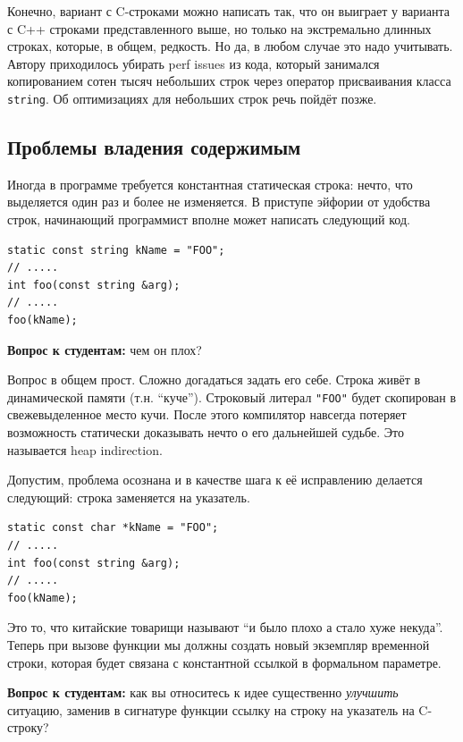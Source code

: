 \documentclass[a4paper,12pt,oneside]{book}
\newif\ifanswers
\begin{document}
Конечно, вариант с C-строками можно написать так, что он выиграет у варианта с C++ строками представленного выше, но только на экстремально длинных строках, которые, в общем, редкость. Но да, в любом случае это надо учитывать. Автору приходилось убирать perf issues из кода, который занимался копированием сотен тысяч небольших строк через оператор присваивания класса \lstinline!string!. Об оптимизациях для небольших строк речь пойдёт позже. 

\subsection{Проблемы владения содержимым}\label{subsub:stringview}

Иногда в программе требуется константная статическая строка: нечто, что выделяется один раз и более не изменяется. В приступе эйфории от удобства строк, начинающий программист вполне может написать следующий код.

\begin{lstlisting}
static const string kName = "FOO";
// .....
int foo(const string &arg);
// .....
foo(kName);
\end{lstlisting}

\textbf{Вопрос к студентам:} чем он плох?

\ifanswers
Ответ ниже.
\fi

Вопрос в общем прост. Сложно догадаться задать его себе. Строка живёт в динамической памяти (т.н. ``куче''). Строковый литерал \lstinline!"FOO"! будет скопирован в свежевыделенное место кучи. После этого компилятор навсегда потеряет возможность статически доказывать нечто о его дальнейшей судьбе. Это называется heap indirection.

Допустим, проблема осознана и в качестве шага к её исправлению делается следующий: строка заменяется на указатель.

\begin{lstlisting}
static const char *kName = "FOO";
// .....
int foo(const string &arg);
// .....
foo(kName);
\end{lstlisting}

Это то, что китайские товарищи называют ``и было плохо а стало хуже некуда''. Теперь при вызове функции мы должны создать новый экземпляр временной строки, которая будет связана с константной ссылкой в формальном параметре.

\textbf{Вопрос к студентам:} как вы относитесь к идее существенно \textit{улучшить} ситуацию, заменив в сигнатуре функции ссылку на строку на указатель на C-строку?
\end{document}
